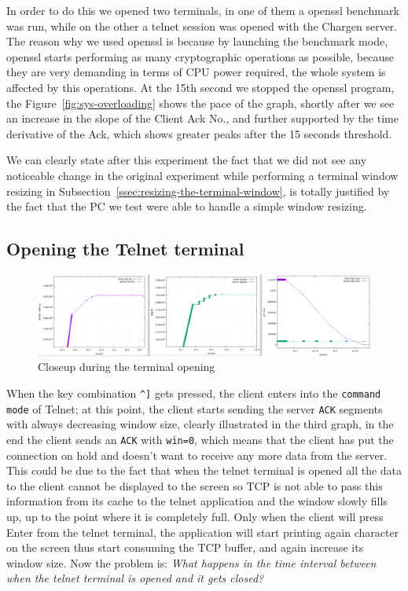\documentclass{exam}
\begin{document}
In order to do this we opened two terminals, in one of them a openssl benchmark was run, while on the other a telnet session was opened with the Chargen server. The reason why we used openssl is because by launching the benchmark mode, openssl starts performing as many cryptographic operations as possible, because they are very demanding in terms of CPU power required, the whole system is affected by this operations. At the 15th second we stopped the openssl program, the Figure~\ref{fig:sys-overloading} shows the pace of the graph, shortly after we see an increase in the slope of the Client Ack No., and further supported by the time derivative of the Ack, which shows greater peaks after the 15 seconds threshold.

We can clearly state after this experiment the fact that we did not see any noticeable change in the original experiment while performing a terminal window resizing in Subsection~\ref{ssec:resizing-the-terminal-window}, is totally justified by the fact that the PC we test were able to handle a simple window resizing.


 
\subsection{Opening the Telnet terminal}
\begin{figure}[H]
    \centering
    \includegraphics[width=1\textwidth]{telnet-term-opening-closeup.png}
    \caption{Closeup during the terminal opening}
    \label{fig:telnet-term-opening-closeup}
\end{figure}
When the key combination \verb|^]| gets pressed, the client enters into the \verb|command mode| of Telnet; at this point, the client starts sending the server \texttt{ACK} segments with always decreasing window size, clearly illustrated in the third graph, in the end the client sends an \texttt{ACK} with \texttt{win=0}, which means that the client has put the connection on hold and doesn't want to receive any more data from the server. This could be due to the fact that when the telnet terminal is opened all the data to the client cannot be displayed to the screen so TCP is not able to pass this information from its cache to the telnet application and the window slowly fills up, up to the point where it is completely full. Only when the client will press Enter from the telnet terminal, the application will start printing again character on the screen thus start consuming the TCP buffer, and again increase its window size. Now the problem is: \textit{What happens in the time interval between when the telnet terminal is opened and it gets closed?}
\end{document}
